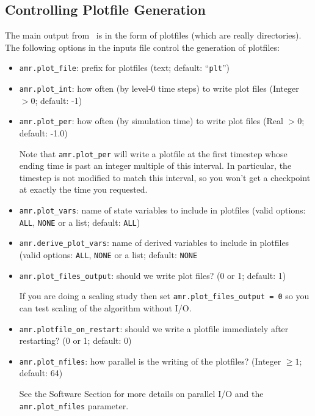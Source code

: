 \subsection{Controlling Plotfile Generation}
\label{sec:PlotFiles}
The main output from \pelelm\ is in the form of plotfiles (which are
really directories).  The following options in the inputs file control
the generation of plotfiles:
\begin{itemize}
\item {\tt amr.plot\_file}: prefix for plotfiles (text; default:
  ``{\tt plt}'')

\item {\tt amr.plot\_int}: how often (by level-0 time steps) to write
  plot files (Integer $> 0$; default: -1)

\item {\tt amr.plot\_per}: how often (by simulation time) to write
  plot files (Real $> 0$; default: -1.0)

  Note that {\tt amr.plot\_per} will write a plotfile at the first
  timestep whose ending time is past an integer multiple of this interval.
  In particular, the timestep is not modified to match this interval, so
  you won't get a checkpoint at exactly the time you requested.

\item {\tt amr.plot\_vars}: name of state variables to include in
  plotfiles (valid options: {\tt ALL}, {\tt NONE} or a list; default:
  {\tt ALL})

\item {\tt amr.derive\_plot\_vars}: name of derived variables to
  include in plotfiles (valid options: {\tt ALL}, {\tt NONE} or a
  list; default: {\tt NONE}

\item {\tt amr.plot\_files\_output}: should we write plot files? (0 or
  1; default: 1)

If you are doing a scaling study then set {\tt amr.plot\_files\_output
  = 0} so you can test scaling of the algorithm without I/O.

\item {\tt amr.plotfile\_on\_restart}: should we write a plotfile
  immediately after restarting?  (0 or 1; default: 0)
  
\item {\tt amr.plot\_nfiles}: how parallel is the writing of the
  plotfiles?  (Integer $\geq 1$; default: 64)

See the Software Section for more details on parallel I/O and the {\tt
  amr.plot\_nfiles} parameter.

\end{itemize}

